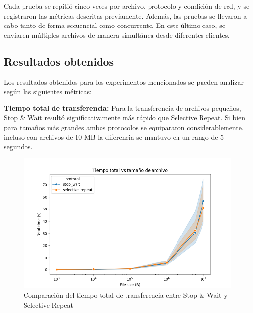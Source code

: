 Cada prueba se repitió cinco veces por archivo, protocolo y condición de red, y se registraron las métricas descritas previamente. Además, las pruebas se llevaron a cabo tanto de forma secuencial como concurrente. En este último caso, se enviaron múltiples archivos de manera simultánea desde diferentes clientes.

\subsection{Resultados obtenidos}

Los resultados obtenidos para los experimentos mencionados se pueden analizar según las siguientes métricas:

\textbf{Tiempo total de transferencia:}
Para la transferencia de archivos pequeños, Stop \& Wait resultó significativamente más rápido que Selective Repeat. Si bien para tamaños más grandes ambos protocolos se equipararon considerablemente, incluso con archivos de 10 MB la diferencia se mantuvo en un rango de 5 segundos.
\begin{figure}[H]
    \centering
    \includegraphics[width=1\linewidth]{images/server_sender_total_time (1).png}
    \caption{Comparación del tiempo total de transferencia entre Stop \& Wait y Selective Repeat}
    \label{fig:total_time_comparison}
\end{figure}

